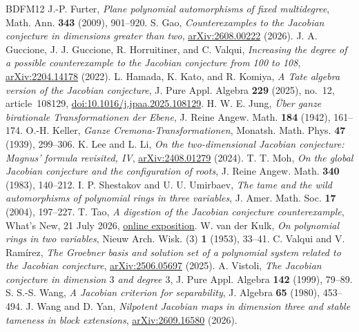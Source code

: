 \documentclass[11pt,reqno]{amsart}
\numberwithin{equation}{section}
\theoremstyle{plain}
\theoremstyle{definition}
\theoremstyle{remark}
\begin{document}
\begin{thebibliography}{BDFM12}
 J.-P. Furter,
\emph{Plane polynomial automorphisms of fixed multidegree},
Math. Ann. \textbf{343} (2009), 901--920.
 S. Gao,
\emph{Counterexamples to the Jacobian conjecture in dimensions greater than two},
\href{https://arxiv.org/abs/2608.00222}{arXiv:2608.00222} (2026).
 J. A. Guccione, J. J. Guccione, R. Horruitiner, and C. Valqui,
\emph{Increasing the degree of a possible counterexample to the Jacobian conjecture from 100 to 108},
\href{https://arxiv.org/abs/2204.14178}{arXiv:2204.14178} (2022).
 L. Hamada, K. Kato, and R. Komiya,
\emph{A Tate algebra version of the Jacobian conjecture},
J. Pure Appl. Algebra \textbf{229} (2025), no.~12, article~108129,
\href{https://doi.org/10.1016/j.jpaa.2025.108129}{doi:10.1016/j.jpaa.2025.108129}.
 H. W. E. Jung,
\emph{\"Uber ganze birationale Transformationen der Ebene},
J. Reine Angew. Math. \textbf{184} (1942), 161--174.
 O.-H. Keller,
\emph{Ganze Cremona-Transformationen},
Monatsh. Math. Phys. \textbf{47} (1939), 299--306.
 K. Lee and L. Li,
\emph{On the two-dimensional Jacobian conjecture: Magnus' formula revisited, IV},
\href{https://arxiv.org/abs/2408.01279}{arXiv:2408.01279} (2024).
 T. T. Moh,
\emph{On the global Jacobian conjecture and the configuration of roots},
J. Reine Angew. Math. \textbf{340} (1983), 140--212.
 I. P. Shestakov and U. U. Umirbaev,
\emph{The tame and the wild automorphisms of polynomial rings in three variables},
J. Amer. Math. Soc. \textbf{17} (2004), 197--227.
 T. Tao,
\emph{A digestion of the Jacobian conjecture counterexample},
What's New, 21 July 2026,
\href{https://terrytao.wordpress.com/2026/07/21/a-digestion-of-the-jacobian-conjecture-counterexample/}{online exposition}.
 W. van der Kulk,
\emph{On polynomial rings in two variables},
Nieuw Arch. Wisk. (3) \textbf{1} (1953), 33--41.
 C. Valqui and V. Ram\'irez,
\emph{The Groebner basis and solution set of a polynomial system related to the Jacobian conjecture},
\href{https://arxiv.org/abs/2506.05697}{arXiv:2506.05697} (2025).
 A. Vistoli,
\emph{The Jacobian conjecture in dimension $3$ and degree $3$},
J. Pure Appl. Algebra \textbf{142} (1999), 79--89.
 S. S.-S. Wang,
\emph{A Jacobian criterion for separability},
J. Algebra \textbf{65} (1980), 453--494.
 J. Wang and D. Yan,
\emph{Nilpotent Jacobian maps in dimension three and stable tameness in block extensions},
\href{https://arxiv.org/abs/2609.16580}{arXiv:2609.16580} (2026).
\end{thebibliography}
\end{document}
